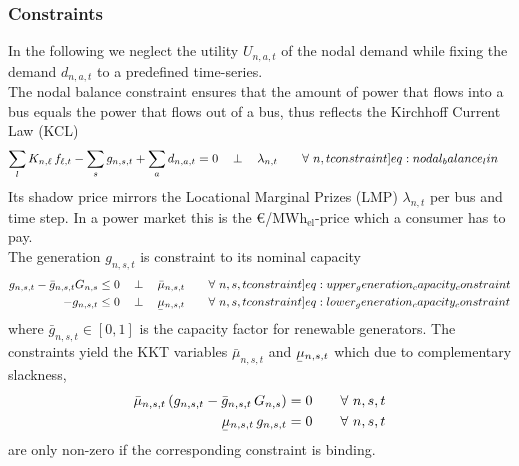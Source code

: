 \documentclass[11pt]{article}
\newcommand{\ubar}[1]{\underaccent{\bar}{#1}}
\newcommand{\generation}[1][n]{g_{#1,s,t}}
\newcommand{\generationpotential}{\bar{g}_{n,s,t}}
\newcommand{\capacityGeneration}{G_{n,s}}
\newcommand{\demand}[1][n]{d_{#1,a,t}}
\newcommand{\utility}{U_{n,a,t}}
\newcommand{\incidence}[1][n]{K_{#1,\ell}}
\newcommand{\mulowergeneration}[1][n]{\ubar{\mu}_{#1,s,t}}
\newcommand{\muuppergeneration}[1][n]{\bar{\mu}_{#1,s,t}}
\newcommand{\lmp}[1][n]{\lambda_{#1,t}}
\newcommand{\flow}{f_{\ell,t}}
\newcommand{\megawatthour}{MWh$_\text{el}$}
\newcommand{\resultsin}[1]{\hspace{12pt} \bot  \hspace{12pt} #1}
\newcommand{\Forall}[1]{\hspace{20pt} \forall \,\, #1 }
\begin{document}
\subsubsection*{Constraints}
In the following we neglect the utility $\utility$ of the nodal demand while fixing the demand $\demand$ to a predefined time-series. \\

The nodal balance constraint ensures that the amount of power that flows into a bus equals the power that flows out of a bus, thus reflects the Kirchhoff Current Law (KCL)
\begin{align}
    \sum_l \incidence \, \flow - \sum_s \generation + \sum_a \demand &= 0 \resultsin{\lmp} \Forall{n,t}
    \label[constraint]{eq:nodal_balance_lin}
\end{align}
Its shadow price mirrors the Locational Marginal Prizes (LMP) $\lmp$ per bus and time step. In a power market this is the \euro/\megawatthour-price which a consumer has to pay. \\

The generation $\generation$ is constraint to its nominal capacity
\begin{align}
 \generation - \generationpotential \capacityGeneration  &\le 0 \resultsin{\muuppergeneration} \Forall{n,s,t} 
 \label[constraint]{eq:upper_generation_capacity_constraint}\\ 
 - \generation &\le 0 \resultsin{\mulowergeneration} \Forall{n,s,t} 
 \label[constraint]{eq:lower_generation_capacity_constraint}
 \end{align}
where $\generationpotential \in \left[ 0,1\right]$ is the capacity factor for renewable generators. The constraints yield the KKT variables $\muuppergeneration$ and $\mulowergeneration$ which due to complementary slackness,
\begin{align}
\muuppergeneration \left( \generation - \generationpotential \, \capacityGeneration \right)  &= 0  \Forall{n,s,t} 
\label{eq:complementary_slackness_upper_generation} \\
\mulowergeneration  \, \generation &= 0 \Forall{n,s,t}
\label{eq:complementary_slackness_lower_generation} 
\end{align}
are only non-zero if the corresponding constraint is binding. \\
\end{document}
